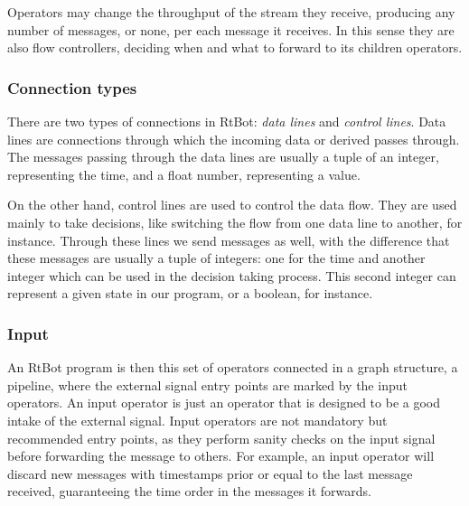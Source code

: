 \documentclass[preprint,1p,times]{elsarticle}
\begin{document}
Operators may change the throughput of the 
stream they receive, producing any number of messages, or none, per each message 
it receives. In this sense they are also flow controllers, deciding when and what 
to forward to its children operators.


\subsubsection{Connection types}
There are two types of connections in RtBot: \textit{data lines} and \textit{control lines}. 
Data lines are connections through which the incoming data or derived passes through. The messages
passing through the data lines are usually a tuple of an integer, representing the time, and a float
number, representing a value.

On the other hand, control lines are used to control the data flow. They are used mainly to take
decisions, like switching the flow from one data line to another, for instance.
Through these lines we send messages as well, with the difference that these messages are usually a tuple
of integers: one for the time and another integer which can be used in the decision taking process. This
second integer can represent a given state in our program, or a boolean, for instance.



\subsubsection{Input}
An RtBot program is then this set of operators connected in a graph structure, 
a pipeline, where the external signal entry points are marked by the input 
operators. An input operator is just an operator that is designed to be a good 
intake of the external signal. Input operators are not mandatory but recommended 
entry points, as they perform sanity checks on the input signal before forwarding 
the message to others. For example, an input operator will discard new messages 
with timestamps prior or equal to the last message received, guaranteeing the time 
order in the messages it forwards.
\end{document}
